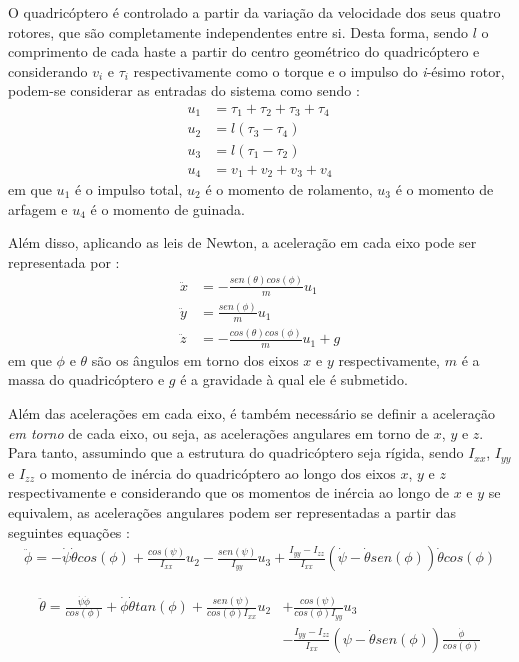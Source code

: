 O quadricóptero é controlado a partir da variação da velocidade dos seus quatro rotores, que são completamente independentes entre si. Desta forma, sendo $l$ o comprimento de cada haste a partir do centro geométrico do quadricóptero e considerando $v_i$ e $\tau_i$ respectivamente como o torque e o impulso do \textit{i}-ésimo rotor, podem-se considerar as entradas do sistema como sendo \cite[p.~4]{Balas2007}:
\begin{align}
u_1 &= \tau_1+\tau_2+\tau_3+\tau_4 \\
u_2 &= l(\tau_3-\tau_4) \\
u_3 &= l(\tau_1-\tau_2) \\
u_4 &= v_1+v_2+v_3+v_4
\end{align}
em que $u_1$ é o impulso total, $u_2$ é o momento de rolamento, $u_3$ é o momento de arfagem e $u_4$ é o momento de guinada.

Além disso, aplicando as leis de Newton, a aceleração em cada eixo pode ser representada por \cite[p.~5]{Balas2007}:
\begin{align}
\ddot{x} &= -\frac{sen(\theta)cos(\phi)}{m}u_1  \\
\ddot{y} &= \frac{sen(\phi)}{m}u_1  \\
\ddot{z} &= - \frac{cos(\theta)cos(\phi)}{m}u_1 +g
\end{align}
em que $\phi$ e $\theta$ são os ângulos em torno dos eixos $x$ e $y$ respectivamente, $m$ é a massa do quadricóptero e $g$ é a gravidade à qual ele é submetido.

Além das acelerações em cada eixo, é também necessário se definir a aceleração \textit{em torno} de cada eixo, ou seja, as acelerações angulares em torno de $x$, $y$ e $z$. Para tanto, assumindo que a estrutura do quadricóptero seja rígida, sendo $I_{xx}$, $I_{yy}$ e $I_{zz}$ o momento de inércia do quadricóptero ao longo dos eixos $x$, $y$ e $z$ respectivamente e considerando que os momentos de inércia ao longo de $x$ e $y$ se equivalem, as acelerações angulares podem ser representadas a partir das seguintes equações \cite[p.~6]{Balas2007}:
\begin{align}
\ddot{\phi} = -\dot{\psi}\dot{\theta}cos(\phi) + 
\frac{cos(\psi)}{I_{xx}}u_2 - 
\frac{sen(\psi)}{I_{yy}}u_3 + 
\frac{I_{yy}-I_{zz}}{I_{xx}}(\dot{\psi}-\dot{\theta}sen(\phi))\dot{\theta}cos(\phi)
\end{align}

\begin{align}
\begin{split}
\ddot{\theta} = \frac{\dot{\psi}\dot{\phi}}{cos(\phi)} +
\dot{\phi}\dot{\theta}tan(\phi) + 
\frac{sen(\psi)}{cos(\phi)I_{xx}}u_2 &+ 
\frac{cos(\psi)}{cos(\phi)I_{yy}}u_3 \\ 
&-\frac{I_{yy}-I_{zz}}{I_{xx}}(\psi-\dot{\theta}sen(\phi))\frac{\dot{\phi}}{cos(\phi)}
\end{split}
\end{align}

